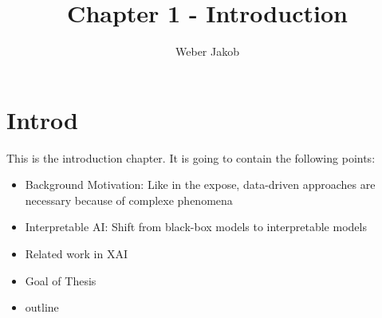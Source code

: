 \documentclass[10pt,a4paper]{article}
\title{Chapter 1 - Introduction}
\author{Weber Jakob}
\begin{document}
	\maketitle

\section{Introd}

This is the introduction chapter. It is going to contain the following points:

\begin{itemize}
	\item Background Motivation: Like in the expose, data-driven approaches are necessary because of complexe phenomena
	\item Interpretable AI: Shift from black-box models to interpretable models
	\item Related work in XAI
	\item Goal of Thesis
	\item outline
\end{itemize}
	
\printbibliography
	
\end{document}
